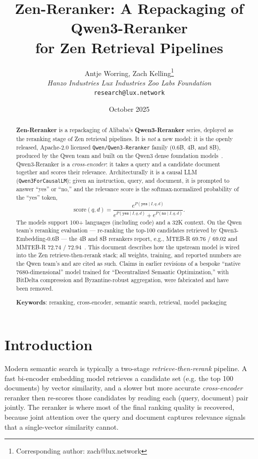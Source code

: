 \documentclass[11pt,letterpaper]{article}
\title{Zen-Reranker: A Repackaging of Qwen3-Reranker\\ for Zen Retrieval Pipelines}
\author{
  Antje Worring, Zach Kelling\thanks{Corresponding author: zach@lux.network} \\
  \textit{Hanzo Industries \quad Lux Industries \quad Zoo Labs Foundation} \\
  \texttt{research@lux.network}
}
\date{October 2025}
\begin{document}
\maketitle

\begin{abstract}
\textbf{Zen-Reranker} is a repackaging of Alibaba's \textbf{Qwen3-Reranker} series, deployed
as the reranking stage of Zen retrieval pipelines. It is \emph{not} a new model: it is the
openly released, Apache-2.0 licensed \texttt{Qwen/Qwen3-Reranker} family (0.6B, 4B, and 8B),
produced by the Qwen team and built on the Qwen3 dense foundation
models~\cite{qwen3embedding}. Qwen3-Reranker is a \emph{cross-encoder}: it takes a query and
a candidate document together and scores their relevance. Architecturally it is a causal LLM
(\texttt{Qwen3ForCausalLM}); given an instruction, query, and document, it is prompted to
answer ``yes'' or ``no,'' and the relevance score is the softmax-normalized probability of
the ``yes'' token,
\[
\mathrm{score}(q,d) = \frac{e^{P(\texttt{yes}\mid I,q,d)}}{e^{P(\texttt{yes}\mid I,q,d)} + e^{P(\texttt{no}\mid I,q,d)}}.
\]
The models support 100+ languages (including code) and a 32K context. On the Qwen team's
reranking evaluation --- re-ranking the top-100 candidates retrieved by Qwen3-Embedding-0.6B
--- the 4B and 8B rerankers report, e.g., MTEB-R 69.76 / 69.02 and MMTEB-R 72.74 /
72.94~\cite{qwen3embedding}. This document describes how the upstream model is wired into the
Zen retrieve-then-rerank stack; all weights, training, and reported numbers are the Qwen
team's and are cited as such. Claims in earlier revisions of a bespoke ``native
7680-dimensional'' model trained for ``Decentralized Semantic Optimization,'' with BitDelta
compression and Byzantine-robust aggregation, were fabricated and have been removed.

\textbf{Keywords}: reranking, cross-encoder, semantic search, retrieval, model packaging
\end{abstract}

\section{Introduction}

Modern semantic search is typically a two-stage \emph{retrieve-then-rerank} pipeline. A fast
bi-encoder embedding model retrieves a candidate set (e.g. the top 100 documents) by vector
similarity, and a slower but more accurate \emph{cross-encoder} reranker then re-scores those
candidates by reading each (query, document) pair jointly. The reranker is where most of the
final ranking quality is recovered, because joint attention over the query and document
captures relevance signals that a single-vector similarity cannot.
\end{document}
